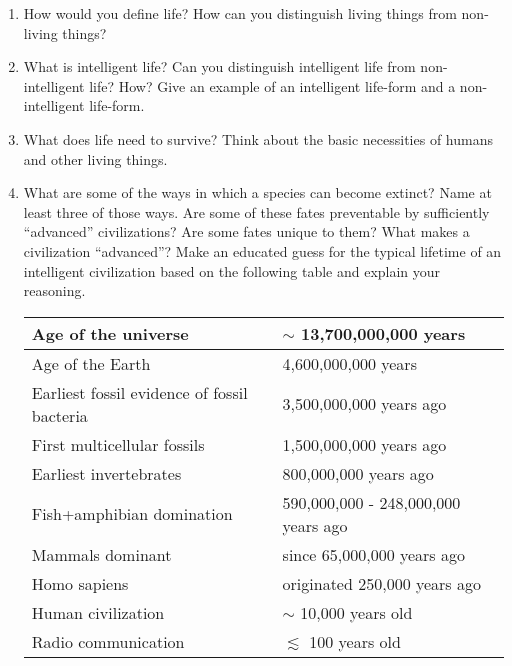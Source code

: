 \documentclass[12pt]{article}%
\begin{document}
\begin{enumerate}

\item How would you define life?  
How can you distinguish living things from non-living things?

\item  What is intelligent life?  
Can you distinguish intelligent life from non-intelligent life?  How? Give an example of an intelligent life-form and a non-intelligent life-form. 


\item  What does life need to survive?  Think about the basic necessities of humans and other living things.

\item What are some of the ways in which a species can become extinct?  Name at least three of those ways.  
Are some of these fates preventable by sufficiently ``advanced'' civilizations?  Are some fates unique to them? What makes a civilization ``advanced''? Make an educated guess for the typical lifetime of an intelligent civilization based on the following table and explain your reasoning.


\begin{center}
\begin{tabular}{|l|l|}
\hline
    Age of the universe & $\sim$ 13,700,000,000 years \\ \hline
    Age of the Earth & 4,600,000,000 years \\ \hline
    Earliest fossil evidence of fossil bacteria & 3,500,000,000 years ago \\ \hline
    First multicellular fossils & 1,500,000,000 years ago \\ \hline
    Earliest invertebrates & 800,000,000 years ago \\ \hline
    Fish+amphibian domination & 590,000,000 - 248,000,000 years ago \\ \hline
    Mammals dominant & since 65,000,000 years ago \\ \hline
    Homo sapiens & originated 250,000 years ago \\ \hline
    Human civilization & $\sim$ 10,000 years old \\ \hline
    Radio communication & $\lesssim$ 100 years old \\ \hline
\end{tabular}
\end{center}

\end{enumerate}
\end{document}
